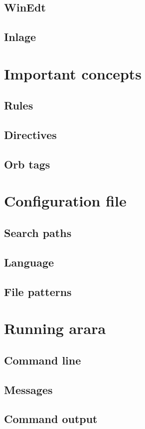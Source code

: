 \documentclass[a4paper,twoside,12pt]{memoir}
\begin{document}
\section{WinEdt}
\section{Inlage}

\chapter{Important concepts}
\section{Rules}
\section{Directives}
\section{Orb tags}

\chapter{Configuration file}
\section{Search paths}
\section{Language}
\section{File patterns}

\chapter{Running arara}
\section{Command line}
\section{Messages}
\section{Command output}
\end{document}
